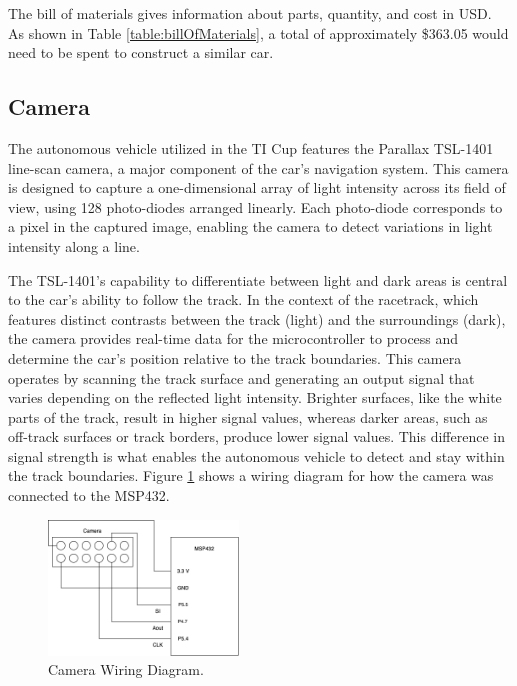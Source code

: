 \documentclass[conference]{IEEEtran}
\begin{document}
The bill of materials gives information about parts, quantity, and cost in USD. As shown in Table \ref{table:billOfMaterials}, a total of approximately \$363.05 would need to be spent to construct a similar car.

\subsection{Camera}

The autonomous vehicle utilized in the TI Cup features the Parallax TSL-1401 line-scan camera, a major component of the car's navigation system. This camera is designed to capture a one-dimensional array of light intensity across its field of view, using 128 photo-diodes arranged linearly. Each photo-diode corresponds to a pixel in the captured image, enabling the camera to detect variations in light intensity along a line.

The TSL-1401's capability to differentiate between light and dark areas is central to the car's ability to follow the track. In the context of the racetrack, which features distinct contrasts between the track (light) and the surroundings (dark), the camera provides real-time data for the microcontroller to process and determine the car's position relative to the track boundaries. This camera operates by scanning the track surface and generating an output signal that varies depending on the reflected light intensity. Brighter surfaces, like the white parts of the track, result in higher signal values, whereas darker areas, such as off-track surfaces or track borders, produce lower signal values. This difference in signal strength is what enables the autonomous vehicle to detect and stay within the track boundaries. Figure \ref{fig:camera} shows a wiring diagram for how the camera was connected to the MSP432.

\begin{figure}[htbp]
	\centerline{\includegraphics[width=0.45\textwidth]{images/cameraWiring.png}}
	\caption{Camera Wiring Diagram.}
	\label{fig:camera}
\end{figure}
\end{document}
